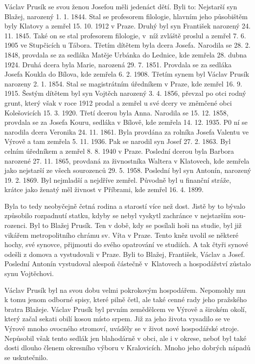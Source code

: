 \documentclass[../dejiny-rodu-prusiku.tex]{subfiles}
\begin{document}
Václav Prusík se svou ženou Josefou měli jedenáct dětí. Byli to: Nejstarší syn Blažej, narozený 1. 1. 1844. Stal se profesorem filologie, hlavním jeho působištěm byly Klatovy a zemřel 15. 10. 1912 v Praze. Druhý byl syn František narozený 24. 11. 1845. Také on se stal profesorem filologie, v níž zvláště proslul a zemřel 7. 6. 1905 ve Stupčicích u Tábora. Třetím dítětem byla dcera Josefa. Narodila se 28. 2. 1848, provdala se za sedláka Matěje Urbánka do Lednice, kde zemřela 28. dubna 1924. Druhá dcera
byla Marie, narozená 29. 7. 1851. Provdala se za sedláka Josefa Koukla do Bílova, kde zemřela 6. 2. 1908. Třetím synem byl Václav Prusík narozeny 2. 1. 1854. Stal se magistrátním úředníkem v Praze, kde zemřel 16. 9. 1915. Šestým dítětem byl syn Vojtěch narozený 3. 4. 1856, převzal po otci rodný grunt, který však v roce 1912 prodal a zemřel u své dcery ve zněmčené obci Kolešovicích 15. 3. 1920. Třetí dcerou byla Anna. Narodila se 15. 12. 1858, provdala se za Josefa Kouru, sedláka v Bílově, kde zemřela 14. 12. 1935. P0 ní se narodila dcera Veronika 24. 11. 1861. Byla provdána za rolníka Josefa Valentu ve Výrově a tam zemřela 5. 11. 1936. Pak se narodil syn Josef 27. 2. 1863. Byl celním úředníkem a zemřel 8. 8. 1940 v Praze. Poslední dcerou byla Barbora narozené 27. 11. 1865, provdaná za živnostníka Waltera v Klatovech, kde zemřela jako nejstarší ze všech sourozenců 29. 5. 1958. Poslední byl syn Antonín, narozený 19. 2. 1869. Byl nejmladší a  nejdříve zemřel. Původně byl u finanční stráže, krátce jako ženatý měl živnost v Příbrami, kde zemřel 16. 4. 1899.

Byla to tedy neobyčejně četná rodina a starostí více než dost. Jistě by to bývalo způsobilo rozpadnutí statku, kdyby se nebyl vyskytl zachránce v nejstarším sou­rozenci. Byl to Blažej Prusík. Ten v době, kdy se posílali hoši na studie, byl již vikářem metropolitního chrá­mu sv. Víta v Praze. Tento kněz uvolil se některé hochy, své synovce, přijmouti do svého opatrování ve studiích. A tak čtyři synové odešli z domova a vystudovali v Praze. Byli to Blažej, František, Václav a Josef. Poslední Antonín vystudoval alespoň částečně v Klatovech a hospodářství zůstalo synu Vojtěchovi.

Václav Prusík byl na svou dobu velmi pokrokovým hospo­dářem. Nepomohly mu k tomu jenom odborné spisy, které pilně četl, ale také cenné rady jeho pražského bratra Blažeje. Václav Prusík byl prvním zemědělcem ve Výrově a širokém okolí, který začal sekati obilí kosou místo srpem. Již za jeho života vysadilo se ve Výrově mnoho ovocného stromoví, uváděly se v život nové hospodářské stroje. Nepůsobil však tento sedlák jen blahodárně v obci, ale i v okrese, neboť byl také dosti dlouho členem okresního výboru v Kralovicích. Mnoho jeho dobrých nápadů se uskutečnilo.
\end{document}
